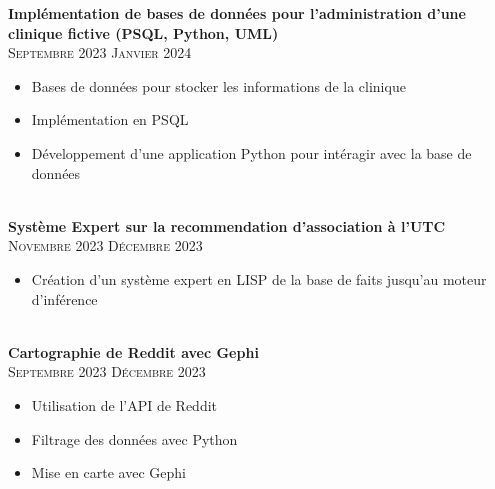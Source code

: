 \documentclass[oneside]{article}
\begin{document}
{\begin{minipage}[t][\dimexpr\textheight-2\fboxrule-2\fboxsep\relax][t]{\dimexpr0.6\textwidth-2\fboxrule-2\fboxsep\relax}
        \vspace{-\baselineskip}
        \vspace{0.3cm}

        {\large \textbf{Implémentation de bases de données pour l'administration d'une clinique fictive (PSQL, Python, UML)}} \\
        {\scshape{}\selectfont\footnotesize Septembre 2023 \textendash{} Janvier 2024} \\
        \vspace{-\baselineskip}
        \vspace{0.2cm}
        \begin{itemize}
            \setlength{\itemsep}{-5pt}
            \item Bases de données pour stocker les informations de la clinique
            \item Implémentation en PSQL
            \item Développement d'une application Python pour intéragir avec la base de données
        \end{itemize}\\

        {\large \textbf{Système Expert sur la recommendation d'association à l'UTC}} \\
        {\scshape{}\selectfont\footnotesize Novembre 2023 \textendash{} Décembre 2023} \\
        \vspace{-\baselineskip}
        \vspace{0.2cm}
        \begin{itemize}
            \setlength{\itemsep}{-5pt}
            \item Création d'un système expert en LISP de la base de faits jusqu'au moteur d'inférence
        \end{itemize}\\
        
        {\large \textbf{Cartographie de Reddit avec Gephi}} \\
        {\scshape{}\selectfont\footnotesize Septembre 2023 \textendash{} Décembre 2023} \\
        \vspace{-\baselineskip}
        \vspace{0.2cm}
        \begin{itemize}
            \setlength{\itemsep}{-5pt}
            \item Utilisation de l'API de Reddit
            \item Filtrage des données avec Python
            \item Mise en carte avec Gephi
        \end{itemize}\\


\end{minipage}}
\end{document}
